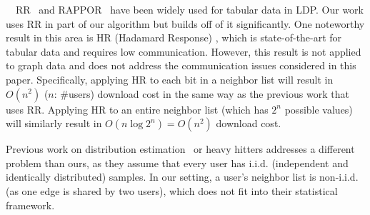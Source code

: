 \smallskip
{}~~RR~\cite{Kairouz_ICML16,Warner_JASA65} 
and 
RAPPOR~\cite{Erlingsson_CCS14} 
have been widely used 
for tabular data 
in 
LDP. 
Our work uses RR in part of our algorithm but
builds off of it significantly. One noteworthy result in this area is HR (Hadamard Response) \cite{Acharya_AISTATS19}, which is state-of-the-art for tabular data
and requires low communication. However, this result is not applied to graph
data and does not address the communication issues considered in this paper.
Specifically, applying HR to each bit in a neighbor list will result in 
$O(n^2)$ ($n$: \#users) download cost 
in the same way as 
the previous work \cite{Imola_USENIX21} that uses RR. 
Applying HR to an entire neighbor list
(which has $2^n$ possible values) will similarly result in 
$O(n \log 2^n) = O(n^2)$ download cost. 

Previous work on distribution estimation~\cite{Kairouz_ICML16,Murakami_USENIX19,Wang_USENIX17} or 
heavy hitters \cite{Bassily_NIPS17} 
addresses a different problem than ours, as they assume that every user has
i.i.d. 
(independent and identically distributed) 
samples. 
In our setting, a user's neighbor list is non-i.i.d. (as one edge is shared by two users), 
which does not
fit into their statistical framework.


